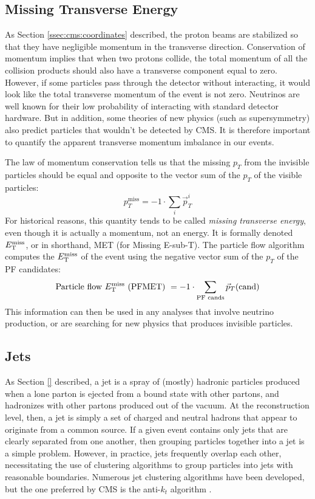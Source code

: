\subsection{Missing Transverse Energy}
\label{ssec:cms:reco:met}

As Section \ref{ssec:cms:coordinates} described, the proton beams are
stabilized so that they have negligible momentum in the transverse
direction. Conservation of momentum implies that when two protons
collide, the total momentum of all the collision products should also
have a transverse component equal to zero. However, if some particles
pass through the detector without interacting, it would look like
the total transverse momentum of the event is not zero. Neutrinos are
well known for their low probability of interacting with standard
detector hardware. But in addition, some theories of new physics (such
as supersymmetry) also predict particles that wouldn't be detected by
CMS. It is therefore important to quantify the apparent transverse
momentum imbalance in our events.

The law of momentum conservation tells us that the missing $p_T$ from
the invisible particles should be equal and opposite to the vector sum
of the $p_T$ of the visible particles:
\begin{equation}
p_T^\text{miss} = -1 \cdot \sum_i \vec{p}_T^i
\end{equation}
For historical reasons, this quantity tends to be called \emph{missing
  transverse energy}, even though it is actually a momentum, not an
energy. It is formally denoted $E_\text{T}^\text{miss}$, or in shorthand, MET (for
Missing E-sub-T). The particle flow algorithm computes the $E_\text{T}^\text{miss}$ of
the event using the negative vector sum of the $p_T$ of the PF
candidates:
\begin{equation}
\text{Particle flow } E_\text{T}^\text{miss} \text{ (PFMET) } =
-1 \cdot \sum_\text{PF cands} \vec{p}_T \text{(cand)}
\end{equation}
This information can then be used in any analyses that involve
neutrino production, or are searching for new physics that produces
invisible particles.

\subsection{Jets}
\label{ssec:cms:reco:jets}

As Section \ref{} described, a jet is a spray %
of (mostly) hadronic particles produced when a lone parton is ejected
from a bound state with other partons, and hadronizes with other
partons produced out of the vacuum. At the reconstruction level, then,
a jet is simply a set of charged and neutral hadrons that appear to
originate from a common source. If a given event contains only jets
that are clearly separated from one another, then grouping particles
together into a jet is a simple problem. However, in practice, jets
frequently overlap each other, necessitating the use of clustering
algorithms to group particles into jets with reasonable
boundaries. Numerous jet clustering algorithms have been developed,
but the one preferred by CMS is the anti-$k_t$ algorithm
\cite{antikt}.

